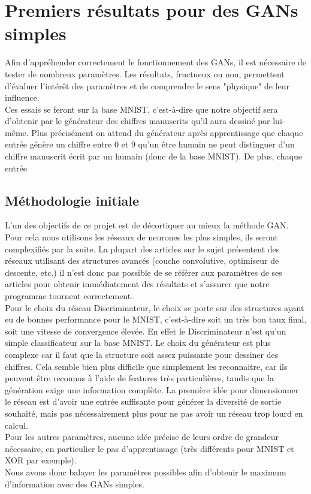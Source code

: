 \section{Premiers résultats pour des GANs simples}
	Afin d'appréhender correctement le fonctionnement des GANs, il est nécessaire de tester de nombreux paramètres. Les résultats, fructueux ou non, permettent d'évaluer l'intérêt des paramètres et de comprendre le sens "physique" de leur influence.\\
	Ces essais se feront sur la base MNIST, c'est-à-dire que notre objectif sera d'obtenir par le générateur des chiffres manuscrits qu'il aura dessiné par lui-même. Plus précisément on attend du générateur après apprentissage que chaque entrée génère un chiffre entre 0 et 9 qu'un être humain ne peut distinguer d'un chiffre manuscrit écrit par un humain (donc de la base MNIST). De plus, chaque entrée 

	\subsection{Méthodologie initiale}
		L'un des objectifs de ce projet est de décortiquer au mieux la méthode GAN. Pour cela nous utilisons les réseaux de neurones les plus simples, ils seront complexifiés par la suite. La plupart des articles sur le sujet présentent des réseaux utilisant des structures avancés (couche convolutive, optimiseur de descente, etc.) il n'est donc pas possible de se référer aux paramètres de ses articles pour obtenir immédiatement des résultats et s'assurer que notre programme tournent correctement. \\
		Pour le choix du réseau Discriminateur, le choix se porte sur des structures ayant eu de bonnes performance pour le MNIST, c'est-à-dire soit un très bon taux final, soit une vitesse de convergence élevée. En effet le Discriminateur n'est qu'un simple classificateur sur la base MNIST. Le choix du générateur est plus complexe car il faut que la structure soit assez puissante pour dessiner des chiffres. Cela semble bien plus difficile que simplement les reconnaitre, car ils peuvent être reconnus à l'aide de features très particulières, tandis que la génération exige une information complète. La première idée pour dimensionner le réseau est d'avoir une entrée suffisante pour générer la diversité de sortie souhaité, mais pas nécessairement plus pour ne pas avoir un réseau trop lourd en calcul.\\
		Pour les autres paramètres, aucune idée précise de leurs ordre de grandeur nécessaire, en particulier le pas d'apprentissage (très différents pour MNIST et XOR par exemple).\\
		Nous avons donc balayer les paramètres possibles afin d'obtenir le maximum d'information avec des GANs simples.




